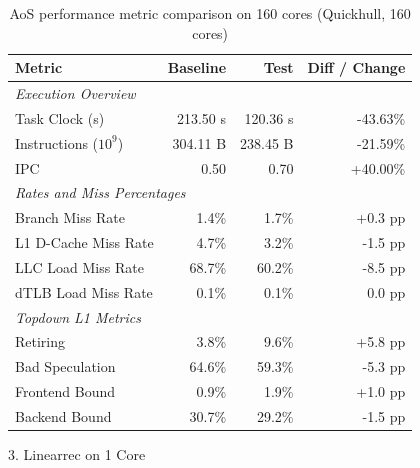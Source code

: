 \documentclass[leqno,11pt]{article}
\begin{document}
    \begin{table}[htbp]
      \centering
      \caption{AoS performance metric comparison on 160 cores (Quickhull, 160 cores)}
      \label{tab:perf_comparison_aos_quickhull_160cores}
      \begin{tabular}{lrrr}
        \toprule
        \textbf{Metric} & \textbf{Baseline} & \textbf{Test} & \textbf{Diff / Change} \\
        \midrule
        \multicolumn{4}{l}{\textit{Execution Overview}} \\
        \quad Task Clock (s)           & 213.50 s   & 120.36 s   & -43.63\%   \\
        \quad Instructions ($10^9$)    & 304.11 B  & 238.45 B  & -21.59\%   \\
        \quad IPC                      & 0.50       & 0.70       & +40.00\%   \\
        \midrule
        \multicolumn{4}{l}{\textit{Rates and Miss Percentages}} \\
        \quad Branch Miss Rate         & 1.4\%      & 1.7\%      & +0.3 pp    \\
        \quad L1 D-Cache Miss Rate     & 4.7\%      & 3.2\%      & -1.5 pp    \\
        \quad LLC Load Miss Rate       & 68.7\%     & 60.2\%     & -8.5 pp    \\
        \quad dTLB Load Miss Rate      & 0.1\%      & 0.1\%      & 0.0 pp     \\
        \midrule
        \multicolumn{4}{l}{\textit{Topdown L1 Metrics}} \\
        \quad Retiring                 & 3.8\%      & 9.6\%      & +5.8 pp    \\
        \quad Bad Speculation          & 64.6\%     & 59.3\%     & -5.3 pp    \\
        \quad Frontend Bound           & 0.9\%      & 1.9\%      & +1.0 pp    \\
        \quad Backend Bound            & 30.7\%      & 29.2\%      & -1.5 pp    \\
        \bottomrule
      \end{tabular}
    \end{table}

  3. Linearrec on 1 Core
\end{document}
